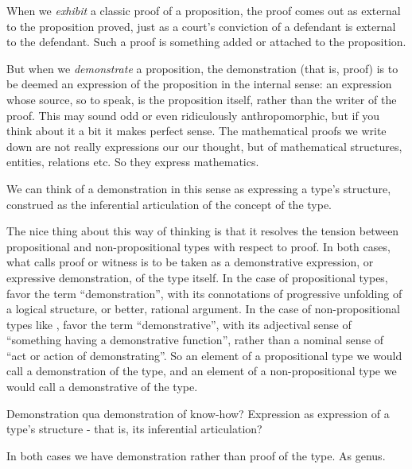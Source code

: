 When we \textit{exhibit} a classic proof of a proposition, the proof
comes out as external to the proposition proved, just as a court's
conviction of a defendant is external to the defendant.  Such a proof
is something added or attached to the proposition.

But when we \textit{demonstrate} a proposition, the demonstration (that is, proof)
is to be deemed an expression of the proposition in the internal
sense: an expression whose source, so to speak, is the proposition
itself, rather than the writer of the proof.  This may sound odd or
even ridiculously anthropomorphic, but if you think about it a bit it
makes perfect sense.  The mathematical proofs we write down are not
really expressions our our thought, but of mathematical structures,
entities, relations etc.  So they express
mathematics.

We can think of a demonstration in this sense as expressing a type's
structure, construed as the inferential articulation of the concept of
the type.

The nice thing about this way of thinking is that it resolves the
tension between propositional and non-propositional types with respect
to proof.  In both cases, what \HoTT{} calls proof or witness is to be
taken as a demonstrative expression, or expressive demonstration, of
the type itself.  In the case of propositional types, favor the term
``demonstration'', with its connotations of progressive unfolding of a
logical structure, or better, rational argument.  In the case of
non-propositional types like \N, favor the term ``demonstrative'',
with its adjectival sense of ``something having a demonstrative
function'', rather than a nominal sense of ``act or action of
demonstrating''.  So an element of a propositional type we would call
a demonstration of the type, and an element of a non-propositional
type we would call a demonstrative of the type.

\begin{remark}
  Demonstration qua demonstration of know-how?  Expression as
  expression of a type's structure - that is, its inferential
  articulation?
\end{remark}

In both cases we have demonstration rather than proof of the type.  As genus.
